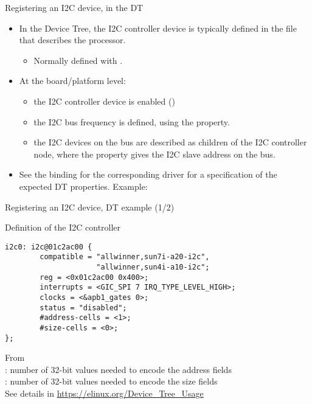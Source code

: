 \begin{frame}{Registering an I2C device, in the DT}
  \begin{itemize}
  \item In the Device Tree, the I2C controller device is typically
    defined in the  file that describes the processor.
    \begin{itemize}
    \item Normally defined with .
    \end{itemize}
  \item At the board/platform level:
    \begin{itemize}
    \item the I2C controller device is enabled
      ()
    \item the I2C bus frequency is defined, using the
       property.
    \item the I2C devices on the bus are described as children of the
      I2C controller node, where the  property gives the I2C
      slave address on the bus.
    \end{itemize}
   \item See the binding for the corresponding driver for a
      specification of the expected DT properties. Example:
  \end{itemize}
\end{frame}

\begin{frame}[fragile]{Registering an I2C device, DT example (1/2)}
  \begin{block}{Definition of the I2C controller}
    \begin{verbatim}
i2c0: i2c@01c2ac00 {
        compatible = "allwinner,sun7i-a20-i2c",
                     "allwinner,sun4i-a10-i2c";
        reg = <0x01c2ac00 0x400>;
        interrupts = <GIC_SPI 7 IRQ_TYPE_LEVEL_HIGH>;
        clocks = <&apb1_gates 0>;
        status = "disabled";
        #address-cells = <1>;
        #size-cells = <0>;
};
    \end{verbatim}
  \end{block}
  \small
  From \\
  \vspace{0.5cm}
  : number of 32-bit values needed to encode the address fields\\
  : number of 32-bit values needed to encode the size fields\\
  See details in \url{https://elinux.org/Device_Tree_Usage}
\end{frame}

